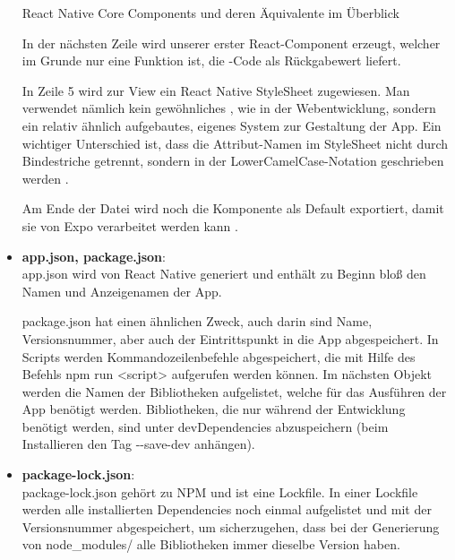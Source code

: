 \begin{itemize}
\begin{center}
  React Native Core Components und deren Äquivalente im Überblick \cite{reactNativeCoreComponents}
\end{center}

In der nächsten Zeile wird unserer erster React-Component erzeugt, welcher im Grunde nur eine
Funktion ist, die -Code als Rückgabewert liefert.

In Zeile 5 wird zur View ein React Native StyleSheet zugewiesen. Man verwendet nämlich kein
gewöhnliches , wie in der Webentwicklung, sondern ein relativ ähnlich aufgebautes,
eigenes System zur Gestaltung der App. Ein wichtiger Unterschied ist, dass die Attribut-Namen im
StyleSheet nicht durch Bindestriche getrennt, sondern in der LowerCamelCase-Notation geschrieben
werden \cite{camelCaseNotation}.

Am Ende der Datei wird noch die Komponente als Default exportiert, damit sie von Expo verarbeitet
werden kann \cite{jsModules}.

\item \textbf{app.json, package.json}:\\
app.json wird von React Native generiert und enthält zu Beginn bloß den Namen und Anzeigenamen der
App.


package.json hat einen ähnlichen Zweck, auch darin sind Name, Versionsnummer, aber auch der
Eintrittspunkt in die App abgespeichert. In Scripts werden Kommandozeilenbefehle abgespeichert, die
mit Hilfe des Befehls npm run <script> aufgerufen werden können. Im nächsten Objekt werden die
Namen der Bibliotheken aufgelistet, welche für das Ausführen der App benötigt werden. Bibliotheken,
die nur während der Entwicklung benötigt werden, sind unter devDependencies abzuspeichern (beim
Installieren den Tag -{}-save-dev anhängen).

\item \textbf{package-lock.json}:\\
package-lock.json gehört zu NPM und ist eine Lockfile. In einer Lockfile werden alle installierten
Dependencies noch einmal aufgelistet und mit der Versionsnummer abgespeichert, um sicherzugehen,
dass bei der Generierung von node\_modules/ alle Bibliotheken immer dieselbe Version haben.


\end{itemize}
